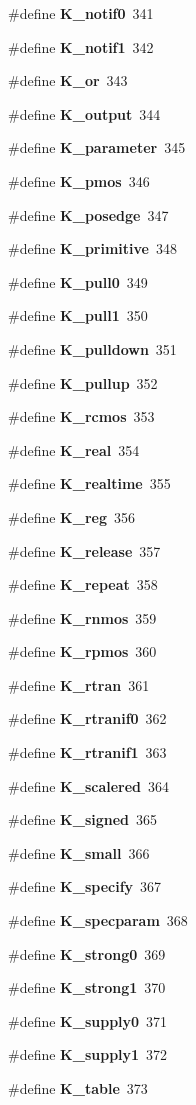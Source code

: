 \begin{CompactItemize}
\#define {\bf K\_\-notif0}\ 341
\item 
\#define {\bf K\_\-notif1}\ 342
\item 
\#define {\bf K\_\-or}\ 343
\item 
\#define {\bf K\_\-output}\ 344
\item 
\#define {\bf K\_\-parameter}\ 345
\item 
\#define {\bf K\_\-pmos}\ 346
\item 
\#define {\bf K\_\-posedge}\ 347
\item 
\#define {\bf K\_\-primitive}\ 348
\item 
\#define {\bf K\_\-pull0}\ 349
\item 
\#define {\bf K\_\-pull1}\ 350
\item 
\#define {\bf K\_\-pulldown}\ 351
\item 
\#define {\bf K\_\-pullup}\ 352
\item 
\#define {\bf K\_\-rcmos}\ 353
\item 
\#define {\bf K\_\-real}\ 354
\item 
\#define {\bf K\_\-realtime}\ 355
\item 
\#define {\bf K\_\-reg}\ 356
\item 
\#define {\bf K\_\-release}\ 357
\item 
\#define {\bf K\_\-repeat}\ 358
\item 
\#define {\bf K\_\-rnmos}\ 359
\item 
\#define {\bf K\_\-rpmos}\ 360
\item 
\#define {\bf K\_\-rtran}\ 361
\item 
\#define {\bf K\_\-rtranif0}\ 362
\item 
\#define {\bf K\_\-rtranif1}\ 363
\item 
\#define {\bf K\_\-scalered}\ 364
\item 
\#define {\bf K\_\-signed}\ 365
\item 
\#define {\bf K\_\-small}\ 366
\item 
\#define {\bf K\_\-specify}\ 367
\item 
\#define {\bf K\_\-specparam}\ 368
\item 
\#define {\bf K\_\-strong0}\ 369
\item 
\#define {\bf K\_\-strong1}\ 370
\item 
\#define {\bf K\_\-supply0}\ 371
\item 
\#define {\bf K\_\-supply1}\ 372
\item 
\#define {\bf K\_\-table}\ 373
\item 

\end{CompactItemize}

